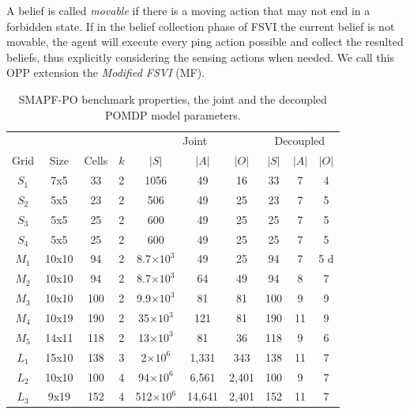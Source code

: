 \documentclass[letterpaper]{article} %
\begin{document}
A belief is called \emph{movable} if there is a moving action that may not end in a forbidden state.
If in the belief collection phase of FSVI the current belief is not movable, the agent will execute every ping action possible and collect the resulted beliefs, thus explicitly considering the sensing actions when needed.
We call this OPP extension the \emph{Modified FSVI} (MF).
\begin{table}[t]
\centering
\tiny
\begin{tabular}{@{}c|ccc|ccc|ccc|}
\toprule
        &       &       &      &\multicolumn{3}{c}{Joint}&\multicolumn{3}{c}{Decoupled}\\
Grid  & Size  & Cells & $k$  & $|S|$ & $|A|$ &$|O|$& $|S|$ & $|A|$&$|O|$ \\ \midrule
$S_1$   & 7x5   & 33    & 2       &  1056 & 49 & 16  & 33  & 7  & 4\\
$S_2$   & 5x5   & 23    & 2       & 506  & 49  & 25& 23  & 7  & 5 \\
$S_3$   & 5x5   & 25    & 2       & 600  & 49  & 25 &  25 &  7 & 5   \\
$S_4$   & 5x5   & 25    & 2       & 600  & 49  & 25 &25 &7  & 5    \\ \midrule
$M_1$    & 10x10 & 94    & 2       &  8.7$\times 10^3$&  49 & 25  &  94 &  7 & 5 d  \\
$M_2$    & 10x10 & 94    & 2       & 8.7$\times 10^3$  &  64 &  49 & 94  & 8  &  7 \\
$M_3$    & 10x10 & 100   & 2       & 9.9$\times 10^3$  &  81 &  81 &  100 &  9 &  9  \\
$M_4$    & 10x19 & 190   & 2       &  35$\times 10^3$ & 121  & 81  & 190  & 11  & 9     \\
$M_5$    & 14x11 & 118   & 2       & 13$\times 10^3$ &  81 & 36  & 118  &  9 & 6       \\ \midrule
$L_1$ & 15x10 & 138   & 3       &  2$\times 10^6$ &  1,331 &  343 &  138 &  11 &  7    \\
$L_2$ & 10x10 & 100   & 4       & 94$\times 10^6$  &  6,561 & 2,401  & 100  &  9 & 7   \\
$L_3$ & 9x19  & 152   & 4       & 512$\times 10^6$  &  14,641 &  2,401 &  152 & 11  &  7  \\ \bottomrule
\end{tabular}
\caption{SMAPF-PO benchmark properties, the joint and the decoupled POMDP model parameters.}
\label{tab:benchmark}
\end{table}
\end{document}
